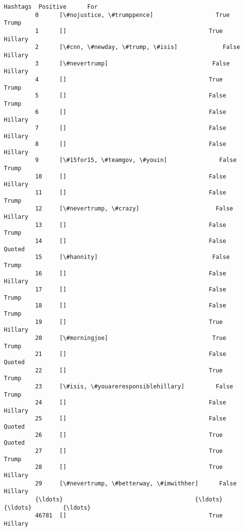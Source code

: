 \documentclass[11pt]{article}
\begin{document}
\begin{Verbatim}[commandchars=\\\{\}]
                                                 Hashtags  Positive      For  
         0      [\#nojustice, \#trumppence]                  True      Trump    
         1      []                                         True      Hillary  
         2      [\#cnn, \#newday, \#trump, \#isis]             False     Hillary  
         3      [\#nevertrump]                              False     Hillary  
         4      []                                         True      Trump    
         5      []                                         False     Trump    
         6      []                                         False     Hillary  
         7      []                                         False     Hillary  
         8      []                                         False     Hillary  
         9      [\#15for15, \#teamgov, \#youin]               False     Trump    
         10     []                                         False     Hillary  
         11     []                                         False     Trump    
         12     [\#nevertrump, \#crazy]                      False     Hillary  
         13     []                                         False     Trump    
         14     []                                         False     Quoted   
         15     [\#hannity]                                 False     Trump    
         16     []                                         False     Hillary  
         17     []                                         False     Trump    
         18     []                                         False     Trump    
         19     []                                         True      Hillary  
         20     [\#morningjoe]                              True      Trump    
         21     []                                         False     Quoted   
         22     []                                         True      Trump    
         23     [\#isis, \#youareresponsiblehillary]         False     Trump    
         24     []                                         False     Hillary  
         25     []                                         False     Quoted   
         26     []                                         True      Quoted   
         27     []                                         True      Trump    
         28     []                                         True      Hillary  
         29     [\#nevertrump, \#betterway, \#imwithher]      False     Hillary  
         {\ldots}                                      {\ldots}        {\ldots}         {\ldots}  
         46781  []                                         True      Hillary  

\end{Verbatim}
\end{document}
